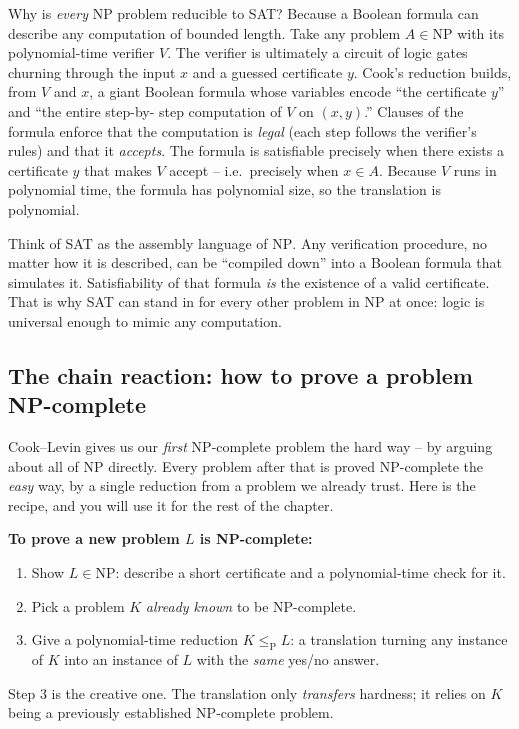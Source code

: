 Why is \emph{every} NP problem reducible to \textsc{SAT}? Because a Boolean
formula can describe any computation of bounded length. Take any
problem $A\in\mathrm{NP}$ with its polynomial-time verifier $V$. The verifier is
ultimately a circuit of logic gates churning through the input $x$ and a guessed
certificate $y$. Cook's reduction builds, from $V$ and $x$, a giant Boolean
formula whose variables encode ``the certificate $y$'' and ``the entire step-by-
step computation of $V$ on $(x,y)$.'' Clauses of the formula enforce that the
computation is \emph{legal} (each step follows the verifier's rules) and that it
\emph{accepts}. The formula is satisfiable precisely when there exists a
certificate $y$ that makes $V$ accept -- i.e.\ precisely when $x\in A$. Because
$V$ runs in polynomial time, the formula has polynomial size, so the translation
is polynomial.

\begin{intuitionbox}
Think of \textsc{SAT} as the assembly language of $\mathrm{NP}$. Any verification
procedure, no matter how it is described, can be ``compiled down'' into a Boolean
formula that simulates it. Satisfiability of that formula \emph{is} the existence
of a valid certificate. That is why \textsc{SAT} can stand in for every other
problem in $\mathrm{NP}$ at once: logic is universal enough to mimic any
computation.
\end{intuitionbox}

\subsection{The chain reaction: how to prove a problem NP-complete}

Cook--Levin gives us our \emph{first} NP-complete problem the hard way -- by
arguing about all of $\mathrm{NP}$ directly. Every problem after that is proved
NP-complete the \emph{easy} way, by a single reduction from a problem we already
trust. Here is the recipe, and you will use it for the rest of the chapter.

\begin{focusbox}
\textbf{To prove a new problem $L$ is NP-complete:}
\begin{enumerate}
  \item Show $L \in \mathrm{NP}$: describe a short certificate and a
        polynomial-time check for it.
  \item Pick a problem $K$ \emph{already known} to be NP-complete.
  \item Give a polynomial-time reduction $K \le_{\mathrm{P}} L$: a translation
        turning any instance of $K$ into an instance of $L$ with the
        \emph{same} yes/no answer.
\end{enumerate}
Step 3 is the creative one. The translation only \emph{transfers} hardness; it
relies on $K$ being a previously established NP-complete problem.
\end{focusbox}


